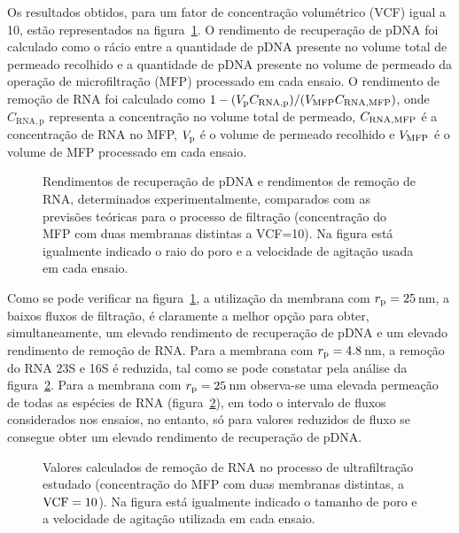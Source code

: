 Os resultados obtidos, para um fator de concentração volumétrico (VCF) igual a 10, estão representados na figura~\ref{fig:4art4}.
%
O rendimento de recuperação de pDNA foi calculado como o rácio entre a quantidade de pDNA presente no volume total de permeado recolhido e a quantidade de pDNA presente no volume de permeado da operação de microfiltração (MFP) processado em cada ensaio. O rendimento de remoção de RNA foi calculado como $1-(V_{\mathrm{p}}C_{\mathrm{RNA,p}})/(V_{\mathrm{MFP}}C_{\mathrm{RNA,MFP}})$, onde $C_{\mathrm{RNA,p}}$ representa a concentração no volume total de permeado, $C_{\mathrm{RNA,MFP}}$ é a concentração de RNA no MFP, $V_{\mathrm{p}}$ é o volume de permeado recolhido e $V_{\mathrm{MFP}}$ é o volume de MFP processado em cada ensaio.
%
\begin{figure}[!t]
	\centering
	
	\caption[Rendimentos de recuperação de pDNA e rendimentos de remoção de RNA (exp.)]{Rendimentos de recuperação de pDNA e rendimentos de remoção de RNA, determinados experimentalmente, comparados com as previsões teóricas para o processo de filtração (concentração do MFP com duas membranas distintas a VCF=10). Na figura está igualmente indicado o raio do poro e a velocidade de agitação usada em cada ensaio.}
	\label{fig:4art4}
\end{figure}

Como se pode verificar na figura~\ref{fig:4art4}, a utilização da membrana com $r_{\mathrm{p}}=25$\,nm, a baixos fluxos de filtração, é claramente a melhor opção para obter, simultaneamente, um elevado rendimento de recuperação de pDNA e um elevado rendimento de remoção de RNA. Para a membrana com $r_{\mathrm{p}}=4.8$\,nm, a remoção do RNA 23S e 16S é reduzida, tal como se pode constatar pela análise da figura~\ref{fig:5art4}. Para a membrana com $r_{\mathrm{p}}=25$\,nm observa-se uma elevada permeação de todas as espécies de RNA (figura~\ref{fig:5art4}), em todo o intervalo de fluxos considerados nos ensaios, no entanto, só para valores reduzidos de fluxo se consegue obter um elevado rendimento de recuperação de pDNA. 
\begin{figure}[!t]
	\centering
	
	\caption[Valores calculados de remoção de RNA no processo de ultrafiltração]{Valores calculados de remoção de RNA no processo de ultrafiltração estudado (concentração do MFP com duas membranas distintas, a $\mathrm{VCF}=10$). Na figura está igualmente indicado o tamanho de poro e a velocidade de agitação utilizada em cada ensaio.}
	\label{fig:5art4}
\end{figure}

